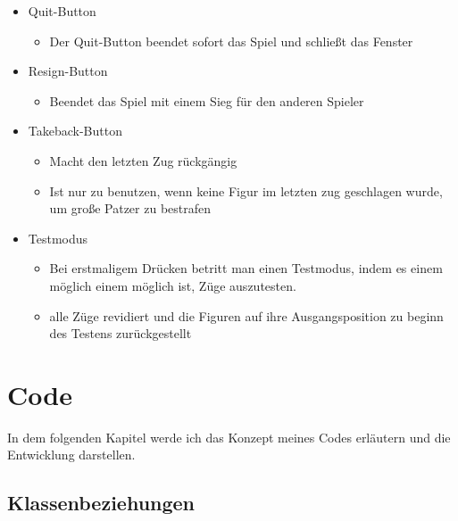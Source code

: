 \documentclass[a4paper, 10pt]{scrartcl}
\begin{document}
\begin{itemize}
        \item \glqq Quit\grqq-Button
        \begin{itemize}
                \item Der Quit-Button beendet sofort das Spiel und schließt das Fenster
        \end{itemize}
        \item \glqq Resign\grqq-Button
        \begin{itemize}
                \item Beendet das Spiel mit einem Sieg für den anderen Spieler
        \end{itemize}
        \item \glqq Takeback\grqq-Button
        \begin{itemize}
                \item Macht den letzten Zug rückgängig
                \item Ist nur zu benutzen, wenn keine Figur im 
                letzten zug geschlagen wurde, um große Patzer zu bestrafen
        \end{itemize}
        \item \glqq Testmodus\grqq
        \begin{itemize}
                \item Bei erstmaligem Drücken betritt man einen Testmodus, indem es einem möglich
                einem möglich ist, Züge auszutesten.
                \item alle Züge revidiert und die Figuren
                auf ihre Ausgangsposition zu beginn des Testens zurückgestellt 
        \end{itemize}
\end{itemize}


\pagebreak
\section{Code}
In dem folgenden Kapitel werde ich das Konzept meines Codes erläutern und die Entwicklung darstellen. 


\subsection{Klassenbeziehungen}
\end{document}
